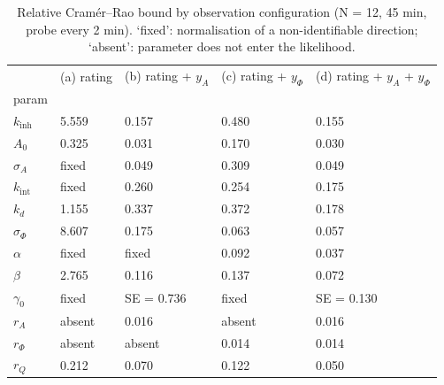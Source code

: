 \begin{table}
\caption{Relative Cram\'er--Rao bound by observation configuration (N = 12, 45 min, probe every 2 min). `fixed': normalisation of a non-identifiable direction; `absent': parameter does not enter the likelihood.}
\label{tab:table2_identifiability}
\begin{tabular}{lllll}
\toprule
 & (a) rating & (b) rating + $y_A$ & (c) rating + $y_\Phi$ & (d) rating + $y_A$ + $y_\Phi$ \\
param &  &  &  &  \\
\midrule
$k_{\mathrm{inh}}$ & 5.559 & 0.157 & 0.480 & 0.155 \\
$A_0$ & 0.325 & 0.031 & 0.170 & 0.030 \\
$\sigma_A$ & fixed & 0.049 & 0.309 & 0.049 \\
$k_{\mathrm{int}}$ & fixed & 0.260 & 0.254 & 0.175 \\
$k_d$ & 1.155 & 0.337 & 0.372 & 0.178 \\
$\sigma_\Phi$ & 8.607 & 0.175 & 0.063 & 0.057 \\
$\alpha$ & fixed & fixed & 0.092 & 0.037 \\
$\beta$ & 2.765 & 0.116 & 0.137 & 0.072 \\
$\gamma_0$ & fixed & SE = 0.736 & fixed & SE = 0.130 \\
$r_A$ & absent & 0.016 & absent & 0.016 \\
$r_\Phi$ & absent & absent & 0.014 & 0.014 \\
$r_Q$ & 0.212 & 0.070 & 0.122 & 0.050 \\
\bottomrule
\end{tabular}
\end{table}

